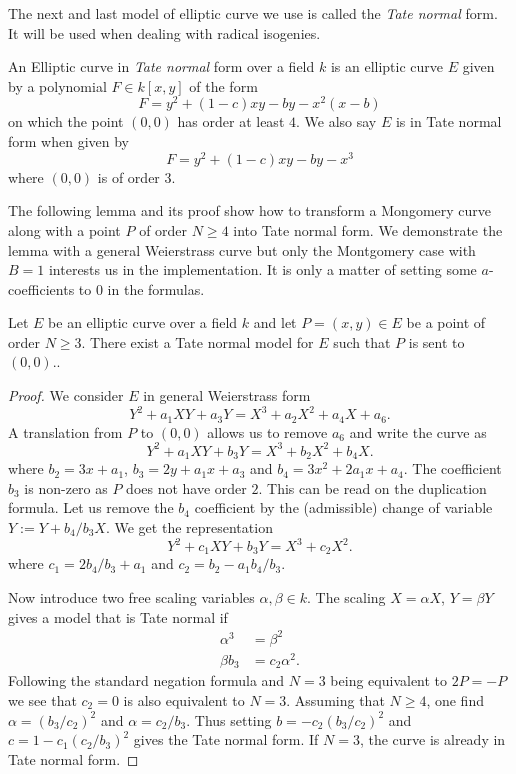 \documentclass[../main/main.tex]{subfiles}
\begin{document}
The next and last model of elliptic curve we use is called the \textit{Tate normal} form.
It will be used when dealing with radical isogenies.
\begin{definition}
	An Elliptic curve in \textit{Tate normal} form over a field $k$ is an elliptic curve $E$ given by a polynomial $F\in k[x, y]$ of the form
	\[
		F = y^2 + (1-c)xy - by - x^2(x-b)
	\]
	on which the point $(0,0)$ has order at least $4$.
	We also say $E$ is in Tate normal form when given by
	\[
		F = y^2 + (1-c)xy - by - x^3
	\]
	where $(0,0)$ is of order $3$.
\end{definition}
The following lemma and its proof show how to transform a Mongomery curve along with a point $P$ of order $N\geq 4$ into Tate normal form.
We demonstrate the lemma with a general Weierstrass curve but only the Montgomery case with $B=1$ interests us in the implementation.
It is only a matter of setting some $a$-coefficients to $0$ in the formulas.
\begin{lemma}
	Let $E$ be an elliptic curve over a field $k$ and let $P=(x, y)\in E$ be a point of order $N\geq 3$.
	There exist a Tate normal model for $E$ such that $P$ is sent to $(0,0)$..
\end{lemma}
\begin{proof}
	We consider $E$ in general Weierstrass form
	\[
		Y^2 + a_1XY + a_3Y = X^3 +a_2 X^2 + a_4 X + a_6.
	\]
	A translation from $P$ to $(0, 0)$ allows us to remove $a_6$ and write the curve as
	\[
		Y^2 + a_1XY + b_3Y = X^3 +b_2 X^2 + b_4 X.
	\]
	where $b_2 = 3x+a_1$, $b_3 = 2y + a_1x + a_3$ and $b_4 = 3x^2 +2a_1x+a_4$.
	The coefficient $b_3$ is non-zero as $P$ does not have order $2$.
	This can be read on the duplication formula.
	Let us remove the $b_4$ coefficient by the (admissible) change of variable $Y :=Y + b_4 /b_3  X$.
	We get the representation
	\[
		Y^2 + c_1XY + b_3Y = X^3 +c_2 X^2.
	\]
	where  $c_1 = 2 b_4 / b_3 + a_1$ and $c_2 = b_2 - a_1b_4/b_3$.

	Now introduce two free scaling variables $\alpha, \beta\in k$.
	The scaling $X = \alpha X$, $Y = \beta Y$ gives a model that is Tate normal if
	\begin{align*}
		{\alpha}^3 &= 	{\beta}^2 \\
		\beta b_3 &= c_2 {\alpha}^2.
	\end{align*}
	Following the standard negation formula and $N=3$ being equivalent to $2P = -P$ we see that $c_2 = 0$ is also equivalent to $N=3$.
	Assuming that $N\geq 4$, one find $\alpha = ({b_3}/c_2)^2$ and $\alpha = c_2/b_3$.
	Thus setting $b = -c_2(b_3/c_2)^2$ and $c = 1-c_1(c_2/b_3)^2$ gives the Tate normal form.
	If  $N=3$, the curve is already in Tate normal form.
\end{proof}
\end{document}
